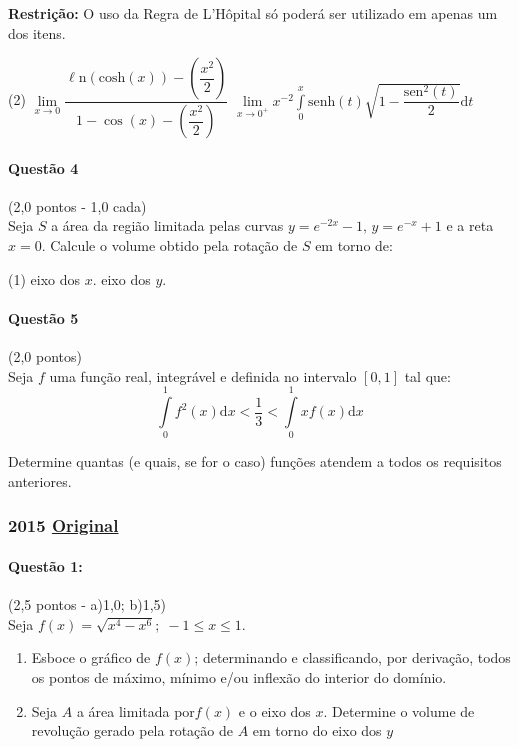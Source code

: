 \documentclass[12pt,a4paper]{article}
\newcommand{\sen}{\mathrm{sen}}
\newcommand{\dd}{\mathrm{d}}
\newcommand{\Ln}{\ell\mathrm{n}}
\newcommand{\original}[1]{\tiny \href{#1}{Original} \normalsize}
\begin{document}
\textbf{Restrição:} O uso da Regra de L'Hôpital só poderá ser utilizado em apenas um dos itens.

\begin{tasks}(2)
\task $\lim\limits_{x\to 0} \dfrac{\Ln(\mathrm{cosh}(x)) - \left(\dfrac{x^2}{2}\right)}{1-\cos (x) - \left(\dfrac{x^2}{2}\right)}$
\task $\lim\limits_{x\to 0^+} x^{-2}\displaystyle\int\limits_0^{x} \mathrm{senh}(t) \sqrt{1-\dfrac{\sen ^2 (t)}{2}}\dd t$
\end{tasks}

\paragraph{Questão 4} (2,0 pontos - 1,0 cada)\\
Seja $S$ a área da região limitada pelas curvas $y=e^{-2x} - 1,\, y=e^{-x}+1$ e a reta $x=0$. Calcule o volume obtido pela rotação de $S$ em torno de:

\begin{tasks}(1)
\task eixo dos $x$.
\task eixo dos $y$.
\end{tasks}

\paragraph{Questão 5} (2,0 pontos)\\
Seja $f$ uma função real, integrável e definida no intervalo $[0,1]$ tal que:$$\int\limits_0^1 f^2(x)\dd x < \dfrac{1}{3}< \int\limits_0^1 xf(x) \dd x$$

Determine quantas (e quais, se for o caso) funções atendem a todos os requisitos anteriores.

\newpage
\subsubsection{2015 \original{https://drive.google.com/open?id=1RXPjZMk1N2RTC_4caGBFqunX45WucsHU}}

\paragraph{Questão 1:}(2,5 pontos - a)1,0; b)1,5)\\
Seja $f(x)=\sqrt{x^4-x^6};\;-1 \leq x \leq 1$.

\begin{enumerate}[label=(\alph*)]

\item Esboce o gráfico de $f(x)$; determinando e classificando, por derivação, todos os pontos de máximo, mínimo e/ou inflexão do interior do domínio.

\item Seja $A$ a área limitada por$f(x)$ e o eixo dos $x$. Determine o volume de revolução gerado pela rotação de $A$ em torno do eixo dos $y$

\end{enumerate}
\end{document}
